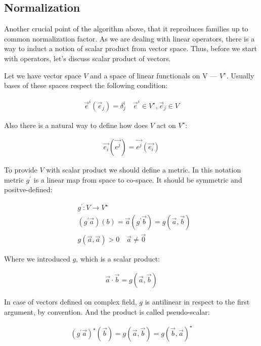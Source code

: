 \subsection*{Normalization}
Another crucial point of the algorithm above, that it reproduces families
up to common normalization factor. As we are dealing with linear operators,
there is a way to induct a notion of scalar product from vector space. Thus,
before we start with operators, let's discuss scalar product of vectors.

Let we have vector space $V$ and a space of linear functionals on V --- $V^\star$.
Usually bases of these spaces respect the following condition:

\begin{align}
    \vec{e}^i(\vec{e}_j) = \delta^i_j \quad \vec{e}^i \in V^\star, \vec{e}_j \in V
\end{align}

Also there is a natural way to define how does $V$ act on $V^\star$:

\begin{align}
    \vec{e_i}(\vec{e^j}) = \vec{e^j}(\vec{e_i})
\end{align}

To provide $V$ with scalar product we should define a metric. In this notation
metric $g^\prime$ is a linear map from space to co-space. It should be symmetric
and positve-defined:

\begin{align}
        &g^\prime: V \rightarrow V^\star \\
        &(g^\prime\vec{a})(b) = \vec{a}(g^\prime\vec{b}) = g(\vec{a}, \vec{b}) \\
        & g(\vec{a}, \vec{a}) > 0 \quad \vec{a} \neq \vec{0}
\end{align}

Where we introduced $g$, which is a scalar product:

\begin{align}
    \vec{a}\cdot\vec{b} = g(\vec{a}, \vec{b})
\end{align}

In case of vectors defined on complex field, $g$ is antilinear in respect to the
first argument, by convention. And the product is called pseudo-scalar:

\begin{align}
    (g^\prime\vec{a})^\star(\vec{b}) = g(\vec{a}, \vec{b}) = g(\vec{b}, \vec{a})^\star
\end{align}

